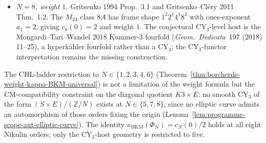 \begin{corollary}
\begin{itemize}
 The $\mathbb{Z}/7$ symplectic action on K3 has three isolated
 fixed points (Nikulin 1980), so the diagonal quotient
 $(S_7 \times E)/\mathbb{Z}_7$ acquires singularities; no smooth
 CY$_3$ host exists, and $N = 7$ is CY$_3$-level obstructed
 at functor level.
\item \emph{$N = 8$, weight $1$.}
 Gritsenko 1994 Prop.~3.1 and Gritsenko--Cl\'ery 2011 Thm.~1.2. The
 $M_{24}$ class $8A$ has
 frame shape $1^2 2^1 4^1 8^2$ with ones-exponent $a_1 = 2$,
 giving $c_8(0) = 2$ and weight $1$. The conjectural CY$_3$-level
 host is the Mongardi--Tari--Wandel 2018 Kummer-$3$ fourfold
 (\emph{Geom.\ Dedicata}~197 (2018) 11--25), a hyperk\"ahler
 fourfold rather than a CY$_3$; the CY$_3$-functor interpretation
 remains the missing construction.
\end{itemize}
The CHL-ladder restriction to $N \in \{1, 2, 3, 4, 6\}$
(Theorem~\ref{thm:borcherds-weight-kappa-BKM-universal}) is not a
limitation of the weight formula but the CM-compatibility constraint
on the diagonal quotient $K3 \times E$: no smooth CY$_3$ of the form
$(S \times E)/(\mathbb{Z}/N)$ exists at $N \in \{5, 7, 8\}$, since no
elliptic curve admits an automorphism of those orders fixing the origin
(Lemma~\ref{lem:programme-scope-aut-elliptic-curve}).
The identity $\kappa_{\mathrm{BKM}}(\Phi_N) = c_N(0)/2$ holds at all eight
Nikulin orders; only the CY$_3$-host geometry is restricted to five.
\end{corollary}

